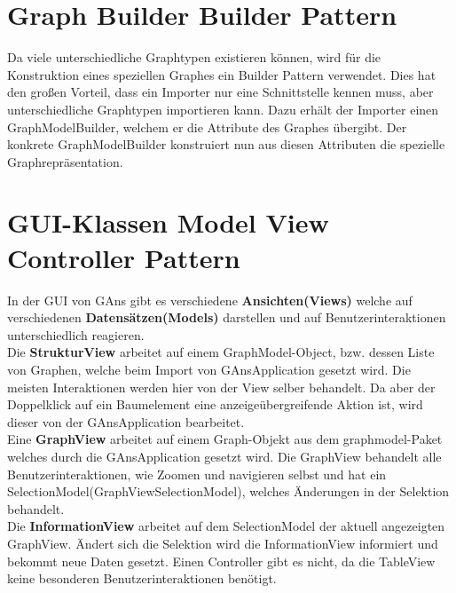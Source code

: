 \section{Graph Builder Builder Pattern}
Da viele unterschiedliche Graphtypen existieren können, wird für die Konstruktion eines speziellen Graphes ein Builder Pattern verwendet.
Dies hat den großen Vorteil, dass ein Importer nur eine Schnittstelle kennen muss, aber unterschiedliche Graphtypen importieren kann.
Dazu erhält der Importer einen GraphModelBuilder, welchem er die Attribute des Graphes übergibt. Der konkrete GraphModelBuilder konstruiert nun aus diesen Attributen die spezielle Graphrepräsentation.

\section{GUI-Klassen Model View Controller Pattern}
In der GUI von GAns gibt es verschiedene \textbf{Ansichten(Views)} welche auf verschiedenen \textbf{Datensätzen(Models)} darstellen und auf Benutzerinteraktionen unterschiedlich reagieren. \\
Die \textbf{StrukturView} arbeitet auf einem GraphModel-Object, bzw. dessen Liste von Graphen, welche beim Import von GAnsApplication gesetzt wird. Die meisten Interaktionen werden hier von der View selber behandelt. Da aber der Doppelklick auf ein Baumelement eine anzeigeübergreifende Aktion ist, wird dieser von der GAnsApplication bearbeitet. \\
Eine \textbf{GraphView} arbeitet auf einem Graph-Objekt aus dem graphmodel-Paket welches durch die GAnsApplication gesetzt wird. Die GraphView behandelt alle Benutzerinteraktionen, wie Zoomen und navigieren selbst und hat ein SelectionModel(GraphViewSelectionModel), welches Änderungen in der Selektion behandelt. \\
Die \textbf{InformationView} arbeitet auf dem SelectionModel der aktuell angezeigten GraphView. Ändert sich die Selektion wird die InformationView informiert und bekommt neue Daten gesetzt. Einen Controller gibt es nicht, da die TableView keine besonderen Benutzerinteraktionen benötigt.